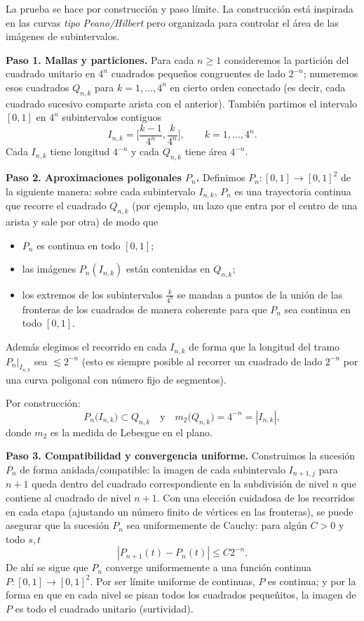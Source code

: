 \begin{solucion}
  La prueba se hace por construcción y paso límite. La construcción está inspirada en las curvas \emph{tipo Peano/Hilbert} pero organizada para controlar el área de las imágenes de subintervalos.

\textbf{Paso 1. Mallas y particiones.}
Para cada \(n\ge 1\) consideremos la partición del cuadrado unitario en \(4^n\) cuadrados pequeños congruentes de lado \(2^{-n}\); numeremos esos cuadrados
\(Q_{n,k}\) para \(k=1,\dots,4^n\) en cierto orden conectado (es decir, cada cuadrado sucesivo comparte arista con el anterior). También partimos el intervalo \([0,1]\) en \(4^n\) subintervalos contiguos
\[
I_{n,k}=\Big[\frac{k-1}{4^n},\frac{k}{4^n}\Big],\qquad k=1,\dots,4^n.
\]
Cada \(I_{n,k}\) tiene longitud \(4^{-n}\) y cada \(Q_{n,k}\) tiene área \(4^{-n}\).

\textbf{Paso 2. Aproximaciones poligonales \(P_n\).}
Definimos \(P_n:[0,1]\to[0,1]^2\) de la siguiente manera: sobre cada subintervalo \(I_{n,k}\), \(P_n\) es una trayectoria continua que recorre el cuadrado \(Q_{n,k}\) (por ejemplo, un lazo que entra por el centro de una arista y sale por otra) de modo que
\begin{itemize}
 \item \(P_n\) es continua en todo \([0,1]\);
 \item las imágenes \(P_n(I_{n,k})\) están contenidas en \(Q_{n,k}\);
 \item los extremos de los subintervalos \(\frac{k}{4^n}\) se mandan a puntos de la unión de las fronteras de los cuadrados de manera coherente para que \(P_n\) sea continua en todo \([0,1]\).
\end{itemize}
Además elegimos el recorrido en cada \(I_{n,k}\) de forma que la longitud del tramo \(P_n|_{I_{n,k}}\) sea \(\lesssim 2^{-n}\) (esto es siempre posible al recorrer un cuadrado de lado \(2^{-n}\) por una curva poligonal con número fijo de segmentos).

Por construcción:
\[
P_n\big(I_{n,k}\big)\subset Q_{n,k}\quad\text{y}\quad m_2\big(Q_{n,k}\big)=4^{-n}=|I_{n,k}|,
\]
donde \(m_2\) es la medida de Lebesgue en el plano.

\textbf{Paso 3. Compatibilidad y convergencia uniforme.}
Construimos la sucesión \(P_n\) de forma anidada/compatible: la imagen de cada subintervalo \(I_{n+1,j}\) para \(n+1\) queda dentro del cuadrado correspondiente en la subdivisión de nivel \(n\) que contiene al cuadrado de nivel \(n+1\). Con una elección cuidadosa de los recorridos en cada etapa (ajustando un número finito de vértices en las fronteras), se puede asegurar que la sucesión \(P_n\) sea uniformemente de Cauchy: para algún \(C>0\) y todo \(s,t\)
\[
|P_{n+1}(t)-P_n(t)|\le C 2^{-n}.
\]
De ahí se sigue que \(P_n\) converge uniformemente a una función continua \(P:[0,1]\to[0,1]^2\). Por ser límite uniforme de continuas, \(P\) es continua; y por la forma en que en cada nivel se pisan todos los cuadrados pequeñitos, la imagen de \(P\) es todo el cuadrado unitario (surtividad).


\end{solucion}
